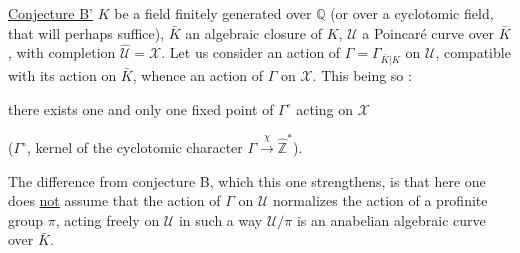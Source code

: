 \uline{Conjecture B'}  $K$ be a field finitely generated over $\mathbb{Q}$ (or over a cyclotomic field, that will perhaps suffice), $\bar K$ an algebraic closure of $K$, $\mathcal U$ a Poincaré curve over $\bar K$, with completion $\widehat{\mathcal U}=\mathcal X$. Let us consider an action of $\Gamma=\Gamma_{\bar K|K}$ on $\mathcal U$, compatible with its action on $\bar K$, whence an action of $\Gamma$ on $\mathcal X$. This being so :

there exists one and only one fixed point of $\Gamma^\circ$ acting on $\mathcal X$

($\Gamma^\circ$, kernel of the cyclotomic character $\Gamma\xrightarrow{\chi}\widehat{\mathbb Z}^{\!*}$).

The difference from conjecture B, which this one strengthens, is that here one does \uline{not} assume that the action of $\Gamma$ on $\mathcal U$ normalizes the action of a profinite group $\pi$, acting freely on $\mathcal U$ in such a way  $\mathcal U/\pi$ is an anabelian algebraic curve over $\bar K$.

